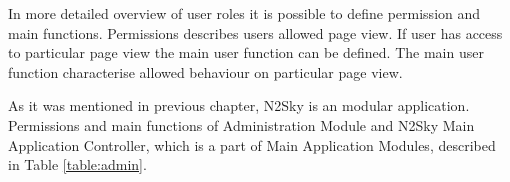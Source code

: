 In more detailed overview of user roles it is possible to define permission and main functions.
Permissions describes users allowed page view. If user has access to particular page view the main user function can be defined. 
The main user function characterise allowed behaviour on particular page view. 

As it was mentioned in previous chapter,  N2Sky is an modular application. Permissions and main functions of Administration Module and N2Sky Main Application Controller, which is a part of Main Application Modules, described in Table \ref{table:admin}.

\begin{table}[]
\caption{User Roles main functions considering "Administration Module" and "N2Sky Main Application Controller". 
"+" for allowed, "-" for disallowed}
\label{table:admin}
\end{table}

